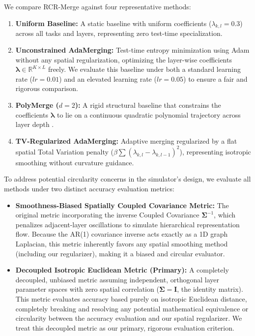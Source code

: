 We compare RCR-Merge against four representative methods:
\begin{enumerate}
    \item \textbf{Uniform Baseline:} A static baseline with uniform coefficients ($\lambda_{k, l} = 0.3$) across all tasks and layers, representing zero test-time specialization.
    \item \textbf{Unconstrained AdaMerging:} Test-time entropy minimization using Adam without any spatial regularization, optimizing the layer-wise coefficients $\boldsymbol{\lambda} \in \mathbb{R}^{K \times L}$ freely. We evaluate this baseline under both a standard learning rate ($lr=0.01$) and an elevated learning rate ($lr=0.05$) to ensure a fair and rigorous comparison.
    \item \textbf{PolyMerge ($d=2$):} A rigid structural baseline that constrains the coefficients $\boldsymbol{\lambda}$ to lie on a continuous quadratic polynomial trajectory across layer depth \citep{polymerge}.
    \item \textbf{TV-Regularized AdaMerging:} Adaptive merging regularized by a flat spatial Total Variation penalty ($\beta \sum (\lambda_{k, l} - \lambda_{k, l-1})^2$), representing isotropic smoothing without curvature guidance.
\end{enumerate}

To address potential circularity concerns in the simulator's design, we evaluate all methods under two distinct accuracy evaluation metrics:
\begin{itemize}
    \item \textbf{Smoothness-Biased Spatially Coupled Covariance Metric:} The original metric incorporating the inverse Coupled Covariance $\boldsymbol{\Sigma}^{-1}$, which penalizes adjacent-layer oscillations to simulate hierarchical representation flow. Because the AR(1) covariance inverse acts exactly as a 1D graph Laplacian, this metric inherently favors any spatial smoothing method (including our regularizer), making it a biased and circular evaluator.
    \item \textbf{Decoupled Isotropic Euclidean Metric (Primary):} A completely decoupled, unbiased metric assuming independent, orthogonal layer parameter spaces with zero spatial correlation ($\boldsymbol{\Sigma} = \mathbf{I}$, the identity matrix). This metric evaluates accuracy based purely on isotropic Euclidean distance, completely breaking and resolving any potential mathematical equivalence or circularity between the accuracy evaluation and our spatial regularizer. We treat this decoupled metric as our primary, rigorous evaluation criterion.
\end{itemize}


